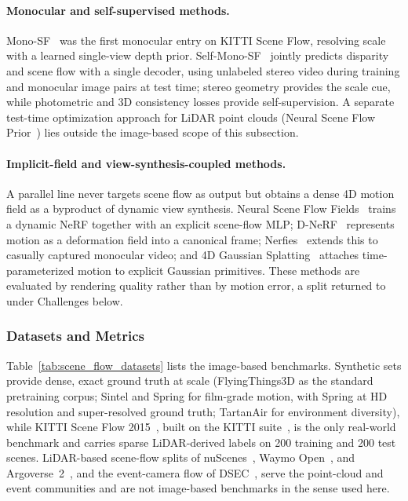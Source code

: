 \paragraph{Monocular and self-supervised methods.}
Mono-SF~\cite{brickwedde2019mono} was the first monocular entry on KITTI Scene Flow, resolving scale with a learned single-view depth prior. Self-Mono-SF~\cite{hur2020self} jointly predicts disparity and scene flow with a single decoder, using unlabeled stereo video during training and monocular image pairs at test time; stereo geometry provides the scale cue, while photometric and 3D consistency losses provide self-supervision. A separate test-time optimization approach for LiDAR point clouds (Neural Scene Flow Prior~\cite{li2021neuralsfp}) lies outside the image-based scope of this subsection.

\paragraph{Implicit-field and view-synthesis-coupled methods.}
A parallel line never targets scene flow as output but obtains a dense 4D motion field as a byproduct of dynamic view synthesis. Neural Scene Flow Fields~\cite{li2021neural} trains a dynamic NeRF together with an explicit scene-flow MLP; D-NeRF~\cite{pumarola2021d} represents motion as a deformation field into a canonical frame; Nerfies~\cite{park2021nerfies} extends this to casually captured monocular video; and 4D Gaussian Splatting~\cite{wu20244d} attaches time-parameterized motion to explicit Gaussian primitives. These methods are evaluated by rendering quality rather than by motion error, a split returned to under Challenges below.

\subsubsection{Datasets and Metrics}

Table~\ref{tab:scene_flow_datasets} lists the image-based benchmarks. Synthetic sets provide dense, exact ground truth at scale (FlyingThings3D as the standard pretraining corpus; Sintel and Spring for film-grade motion, with Spring at HD resolution and super-resolved ground truth; TartanAir for environment diversity), while KITTI Scene Flow 2015~\cite{menze2015object}, built on the KITTI suite~\cite{KITTI-GeigerLU12}, is the only real-world benchmark and carries sparse LiDAR-derived labels on 200 training and 200 test scenes. LiDAR-based scene-flow splits of nuScenes~\cite{caesar2020nuscenes}, Waymo Open~\cite{WaymoOpen-SunKDCPTGZCCVHN20}, and Argoverse~2~\cite{wilson2023argoverse}, and the event-camera flow of DSEC~\cite{gehrig2021dsec}, serve the point-cloud and event communities and are not image-based benchmarks in the sense used here.

